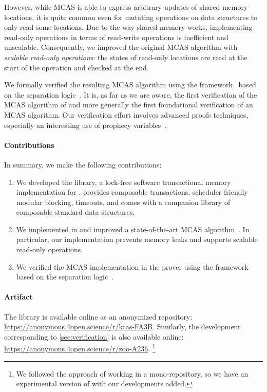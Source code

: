 However, while MCAS is able to express arbitrary updates of shared memory locations, it is quite common even for mutating operations on data structures to only read some locations.
Due to the way shared memory works, implementing read-only operations in terms of read-write operations is inefficient and unscalable.
Consequently, we improved the original MCAS algorithm with \emph{scalable read-only operations}: the states of read-only locations are read at the start of the operation and checked at the end.

We formally verified the resulting MCAS algorithm using the \Zoo framework~\citep{DBLP:journals/pacmpl/AllainS26} based on the \Iris separation logic~\citep{DBLP:journals/jfp/JungKJBBD18}.
It is, as far as we are aware, the first verification of the MCAS algorithm of \citet{DBLP:conf/wdag/GuerraouiKMZ20} and more generally the first foundational verification of an MCAS algorithm.
Our verification effort involves advanced proofs techniques, especially an interesting use of prophecy variables~\citep{DBLP:journals/pacmpl/JungLPRTDJ20}.

\paragraph{Contributions}

In summary, we make the following contributions:

\begin{enumerate}
  \item
    We developed the \Kcas library, a lock-free software transactional memory implementation for \OCamlFive.
    \Kcas provides composable transactions, scheduler friendly modular blocking, timeouts, and comes with a companion library of composable standard data structures.
  \item
    We implemented in \OCamlFive and improved a state-of-the-art MCAS algorithm~\citep{DBLP:conf/wdag/GuerraouiKMZ20}.
    In particular, our implementation prevents memory leaks and supports scalable read-only operations.
  \item
    We verified the MCAS implementation in the \Rocq prover using the \Zoo framework~\citep{DBLP:journals/pacmpl/AllainS26} based on the \Iris separation logic~\citep{DBLP:journals/jfp/JungKJBBD18}.
\end{enumerate}

\paragraph{Artifact}

The \Kcas library is available online as an anonymized \GitHub repository: \url{https://anonymous.4open.science/r/kcas-FA3B}.
Similarly, the \Rocq development corresponding to \cref{sec:verification} is also available online: \url{https://anonymous.4open.science/r/zoo-A236}.%
\footnote{
We followed the \Zoo approach of working in a mono-repository, so we have an experimental version of \Zoo with our developments added.
}
